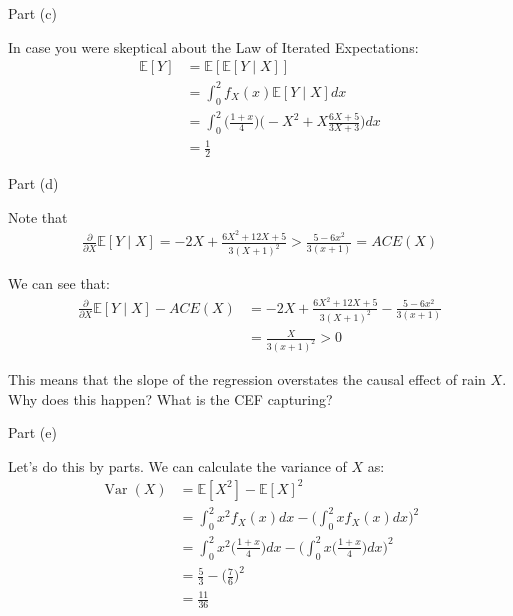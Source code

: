 \begin{frame}{Part (c)}

    In case you were skeptical about the Law of Iterated Expectations:
    \begin{align*}
        \mathbb{E}[Y] &= \mathbb{E}[ \mathbb{E}[Y \mid X] ]
        \\
        &= \int_0^2 f_X(x) \mathbb{E}[Y \mid X] dx
        \\
        &= \int_0^2 \Biggr( \frac{1+x}{4} \Biggr) \Biggr( -X^2 + X \frac{6X  + 5}{3X + 3} \Biggr) dx
        \\
        &= \frac{1}{2}
    \end{align*}

\end{frame}

\begin{frame}{Part (d)}

    Note that
    \begin{align*}
        \frac{\partial}{\partial X} \mathbb{E}[Y \mid X] = -2X + \frac{6X^2 + 12X + 5}{3(X + 1)^2} > \frac{5 - 6x^2}{3(x + 1)} = ACE(X)
    \end{align*}

    We can see that:
    \begin{align*}
        \frac{\partial}{\partial X} \mathbb{E}[Y \mid X] - ACE(X) &= -2X + \frac{6X^2 + 12X + 5}{3(X + 1)^2} - \frac{5 - 6x^2}{3(x + 1)}
        \\
        &= \frac{X}{3(x + 1)^2} > 0
    \end{align*}

    This means that the slope of the regression overstates the causal effect of rain $X$. Why does this happen? What is the CEF capturing?

\end{frame}

\begin{frame}{Part (e)}

    Let's do this by parts. We can calculate the variance of $X$ as:
    \begin{align*}
        \operatorname{Var}(X) &= \mathbb{E}[X^2] - \mathbb{E}[X]^2
        \\
        &= \int_0^2 x^2 f_X(x) dx - \Biggr( \int_0^2 x f_X(x) dx \Biggr)^2
        \\
        &= \int_0^2 x^2 \Biggr( \frac{1+x}{4} \Biggr) dx - \Biggr( \int_0^2 x \Biggr( \frac{1+x}{4} \Biggr) dx \Biggr)^2
        \\
        &= \frac{5}{3} - \Biggr( \frac{7}{6} \Biggr)^2
        \\
        &= \frac{11}{36}
    \end{align*}

\end{frame}

